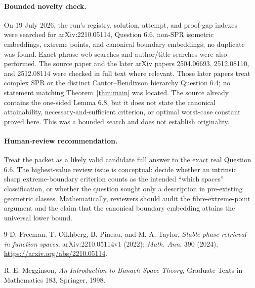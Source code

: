 \documentclass[11pt]{article}
\begin{document}
\paragraph{Bounded novelty check.}
On 19 July 2026, the run's registry, solution, attempt, and proof-gap indexes
were searched for arXiv:2210.05114, Question 6.6, non-SPR isometric embeddings,
extreme points, and canonical boundary embeddings; no duplicate was found.
Exact-phrase web searches and author/title searches were also performed.  The
source paper and the later arXiv papers 2504.06693, 2512.08110, and 2512.08114
were checked in full text where relevant.  Those later papers treat complex
SPR or the distinct Cantor--Bendixson hierarchy Question 6.4; no statement
matching Theorem~\ref{thm:main} was located.  The source already contains the
one-sided Lemma 6.8, but it does not state the canonical attainability,
necessary-and-sufficient criterion, or optimal worst-case constant proved
here.  This was a bounded search and does not establish originality.

\paragraph{Human-review recommendation.}
Treat the packet as a likely valid candidate full answer to the exact real
Question 6.6.  The highest-value review issue is conceptual: decide whether an
intrinsic sharp extreme-boundary criterion counts as the intended
``which spaces'' classification, or whether the question sought only a
description in pre-existing geometric classes.  Mathematically, reviewers
should audit the fibre-extreme-point argument and the claim that the canonical
boundary embedding attains the universal lower bound.

\begin{thebibliography}{9}
D. Freeman, T. Oikhberg, B. Pineau, and M. A. Taylor,
\emph{Stable phase retrieval in function spaces},
arXiv:2210.05114v1 (2022); \emph{Math. Ann.} 390 (2024),
\url{https://arxiv.org/abs/2210.05114}.

R. E. Megginson,
\emph{An Introduction to Banach Space Theory},
Graduate Texts in Mathematics 183, Springer, 1998.
\end{thebibliography}
\end{document}
